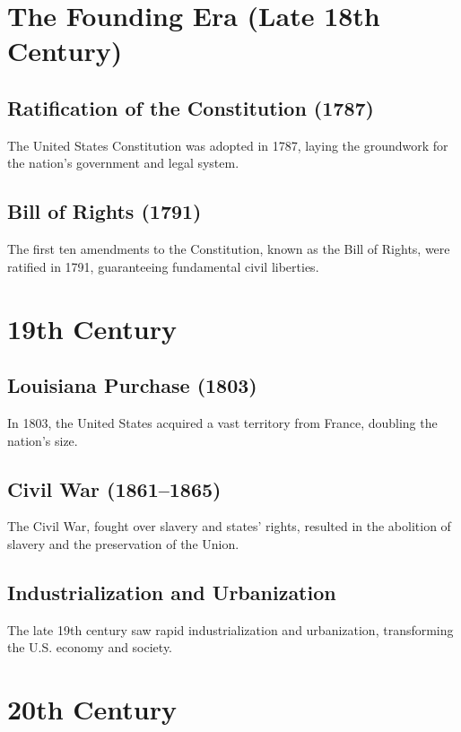 \documentclass{book}
\begin{document}
\section{The Founding Era (Late 18th Century)}
\label{sec:founding-era}
\subsection{Ratification of the Constitution (1787)}
\label{subsec:ratification-constitution}
The United States Constitution was adopted in 1787, laying the groundwork for the nation’s government and legal system.

\subsection{Bill of Rights (1791)}
\label{subsec:bill-of-rights}
The first ten amendments to the Constitution, known as the Bill of Rights, were ratified in 1791, guaranteeing fundamental civil liberties.

\section{19th Century}
\label{sec:19th-century}
\subsection{Louisiana Purchase (1803)}
\label{subsec:louisiana-purchase}
In 1803, the United States acquired a vast territory from France, doubling the nation’s size.

\subsection{Civil War (1861–1865)}
\label{subsec:civil-war}
The Civil War, fought over slavery and states’ rights, resulted in the abolition of slavery and the preservation of the Union.

\subsection{Industrialization and Urbanization}
\label{subsec:industrialization-urbanization}
The late 19th century saw rapid industrialization and urbanization, transforming the U.S. economy and society.

\section{20th Century}
\label{sec:20th-century}
\end{document}
